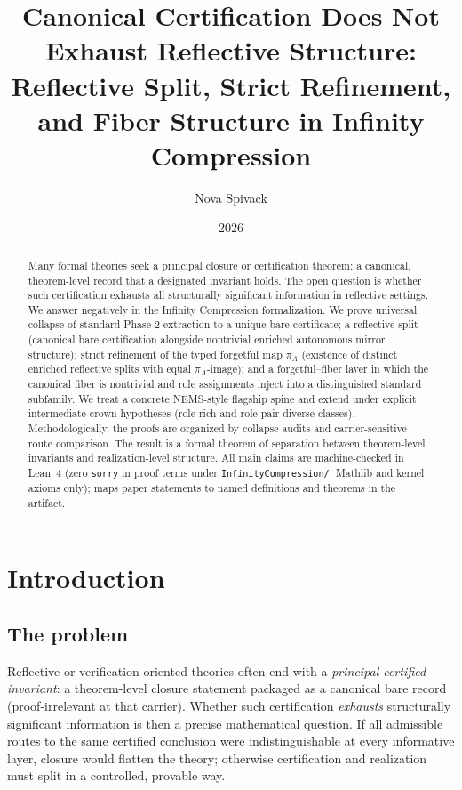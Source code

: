 \documentclass[11pt]{article}
\title{Canonical Certification Does Not Exhaust Reflective Structure:\\Reflective Split, Strict Refinement, and Fiber Structure in Infinity Compression}
\author{Nova Spivack}
\date{2026}
\begin{document}
\maketitle

\begin{abstract}
Many formal theories seek a principal closure or certification theorem: a canonical, theorem-level record that a designated invariant holds. The open question is whether such certification exhausts all structurally significant information in reflective settings. We answer negatively in the Infinity Compression formalization. We prove universal collapse of standard Phase-2 extraction to a unique bare certificate; a reflective split (canonical bare certification alongside nontrivial enriched autonomous mirror structure); strict refinement of the typed forgetful map $\pi_A$ (existence of distinct enriched reflective splits with equal $\pi_A$-image); and a forgetful--fiber layer in which the canonical fiber is nontrivial and role assignments inject into a distinguished standard subfamily. We treat a concrete NEMS-style flagship spine and extend under explicit intermediate crown hypotheses (role-rich and role-pair-diverse classes). Methodologically, the proofs are organized by collapse audits and carrier-sensitive route comparison. The result is a formal theorem of separation between theorem-level invariants and realization-level structure. All main claims are machine-checked in Lean~4 (zero \texttt{sorry} in proof terms under \texttt{InfinityCompression/}; Mathlib and kernel axioms only);  maps paper statements to named definitions and theorems in the artifact.
\end{abstract}

\tableofcontents
\newpage

\section{Introduction}\label{sec:intro}

\subsection{The problem}\label{sec:intro-problem}
Reflective or verification-oriented theories often end with a \emph{principal certified invariant}: a theorem-level closure statement packaged as a canonical bare record (proof-irrelevant at that carrier). Whether such certification \emph{exhausts} structurally significant information is then a precise mathematical question. If all admissible routes to the same certified conclusion were indistinguishable at every informative layer, closure would flatten the theory; otherwise certification and realization must split in a controlled, provable way.
\end{document}

